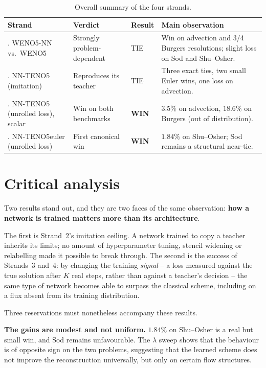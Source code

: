 \documentclass[12pt,a4paper,oneside]{report}
\begin{document}
\begin{table}[H]
\centering
\small
\begin{tabularx}{\textwidth}{@{}>{\raggedright\arraybackslash}p{}>{\raggedright\arraybackslash}p{}>{\centering\arraybackslash}p{}>{\raggedright\arraybackslash}X@{}}
\toprule
\textbf{Strand} & \textbf{Verdict} & \textbf{Result} & \textbf{Main observation} \\
\midrule
1. WENO5-NN vs.\ WENO5 & Strongly problem-dependent & TIE & Win on advection and 3/4 Burgers resolutions; slight loss on Sod and Shu--Osher. \\
\rowrule
2. NN-TENO5 (imitation) & Reproduces its teacher & TIE & Three exact ties, two small Euler wins, one loss on advection. \\
\rowrule
3. NN-TENO5 (unrolled loss), scalar & Win on both benchmarks & \textbf{WIN} & $3.5\%$ on advection, $18.6\%$ on Burgers (out of distribution). \\
\rowrule
4. NN-TENO5euler (unrolled loss) & First canonical win & \textbf{WIN} & $1.84\%$ on Shu--Osher; Sod remains a structural near-tie. \\
\bottomrule
\end{tabularx}
\caption{Overall summary of the four strands.}
\label{tab:summary}
\end{table}

\section{Critical analysis}

Two results stand out, and they are two faces of the same observation:
\textbf{how a network is trained matters more than its architecture}.

The first is Strand~2's imitation ceiling. A network trained to copy a teacher
inherits its limits; no amount of hyperparameter tuning, stencil widening or
relabelling made it possible to break through. The second is the success of
Strands~3 and~4: by changing the training \emph{signal} -- a loss measured
against the true solution after $K$ real steps, rather than against a teacher's
decision -- the same type of network becomes able to surpass the classical
scheme, including on a flux absent from its training distribution.

Three reservations must nonetheless accompany these results.

\textbf{The gains are modest and not uniform.} $1.84\%$ on Shu--Osher is a real
but small win, and Sod remains unfavourable. The $\lambda$ sweep shows that the
behaviour is of opposite sign on the two problems, suggesting that the learned
scheme does not improve the reconstruction universally, but only on certain
flow structures.
\end{document}
